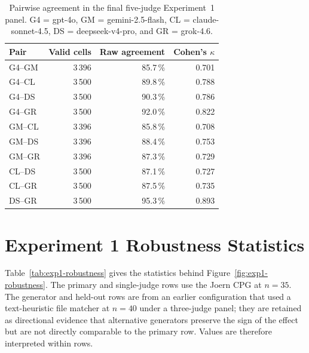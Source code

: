 \begin{table}[htbp]
    \centering
    \caption{Pairwise agreement in the final five-judge Experiment~1 panel.
             G4 = gpt-4o, GM = gemini-2.5-flash, CL = claude-sonnet-4.5,
             DS = deepseek-v4-pro, and GR = grok-4.6.}
    \label{tab:exp1-agreement}
    \small
    \begin{tabular}{lrrr}
        \toprule
        Pair & Valid cells & Raw agreement & Cohen's $\kappa$ \\
        \midrule
        G4--GM & 3\,396 & 85.7\,\% & 0.701 \\
        G4--CL & 3\,500 & 89.8\,\% & 0.788 \\
        G4--DS & 3\,500 & 90.3\,\% & 0.786 \\
        G4--GR & 3\,500 & 92.0\,\% & 0.822 \\
        GM--CL & 3\,396 & 85.8\,\% & 0.708 \\
        GM--DS & 3\,396 & 88.4\,\% & 0.753 \\
        GM--GR & 3\,396 & 87.3\,\% & 0.729 \\
        CL--DS & 3\,500 & 87.1\,\% & 0.727 \\
        CL--GR & 3\,500 & 87.5\,\% & 0.735 \\
        DS--GR & 3\,500 & 95.3\,\% & 0.893 \\
        \bottomrule
    \end{tabular}
\end{table}

\section{Experiment 1 Robustness Statistics}
\label{app:supporting-robustness}

Table~\ref{tab:exp1-robustness} gives the statistics behind
Figure~\ref{fig:exp1-robustness}. The primary and single-judge rows use the
Joern CPG at $n = 35$. The generator and held-out rows are from an earlier
configuration that used a text-heuristic file matcher at $n = 40$ under a
three-judge panel; they are retained as directional evidence that alternative
generators preserve the sign of the effect but are not directly comparable
to the primary row. Values are therefore interpreted within rows.

